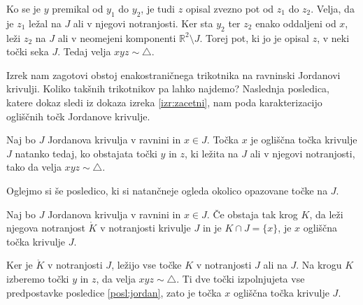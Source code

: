 \documentclass[mat1]{fmfdelo}
\newcommand{\R}{\mathbb R}
\begin{document}
Ko se je $y$ premikal od $y_1$ do $y_2$, je tudi $z$ opisal zvezno pot od $z_1$ do $z_2$. Velja, da je $z_1$ ležal na $J$ ali v njegovi notranjosti. Ker sta $y_2$ ter $z_2$ enako oddaljeni od $x$, leži $z_2$ na $J$ ali v neomejeni komponenti $\R^2 \setminus J$. Torej pot, ki jo je opisal $z$, v neki točki seka $J$. Tedaj velja $xyz \sim \triangle$.

\begin{center}
\end{center}
\endproof

Izrek nam zagotovi obstoj enakostraničnega trikotnika na ravninski Jordanovi krivulji. Koliko takšnih trikotnikov pa lahko najdemo? Naslednja posledica, katere dokaz sledi iz dokaza izreka \ref{izr:zacetni}, nam poda karakterizacijo ogliščnih točk Jordanove krivulje.
\begin{posledica}\label{posl:jordan}
Naj bo $J$ Jordanova krivulja v ravnini in $x \in J$. Točka $x$ je ogliščna točka krivulje $J$ natanko tedaj, ko obstajata točki $y$ in $z$, ki ležita na $J$ ali v njegovi notranjosti, tako da velja $xyz \sim \triangle$.
\end{posledica}

Oglejmo si še posledico, ki si natančneje ogleda okolico opazovane točke na $J$.
\begin{posledica}
Naj bo $J$ Jordanova krivulja v ravnini in $x \in J$. Če obstaja tak krog $K$, da leži njegova notranjost $\mathring{K}$ v notranjosti krivulje $J$ in je $K \cap J = \{x\}$, je $x$ ogliščna točka krivulje $J$.
\end{posledica}
\proof
Ker je $\mathring{K}$ v notranjosti $J$, ležijo vse točke $K$ v notranjosti $J$ ali na $J$. Na krogu $K$ izberemo točki $y$ in $z$, da velja $xyz \sim \triangle$. Ti dve točki izpolnjujeta vse predpostavke posledice \ref{posl:jordan}, zato je točka $x$ ogliščna točka krivulje $J$.
\endproof
\end{document}
